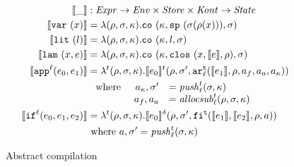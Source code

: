 \documentclass[preprint,onecolumn,9pt]{sigplanconf} %
\begin{document}
\begin{figure}
\begin{align*}
\compile{\_} &: \Expr \to \Env \times \Store \times \Kont \to \State \\
\compile{\svar\mvar} &=
 \lambda(\menv,\msto,\mkont) .
\spchoice
{\co{\mkont,\saddr{\menv(\mvar)},\msto}}
{\co{\mkont,\superposition{\msto(\menv(\mvar))},\msto}}
\\
\compile{\slit\mlit} &= \lambda(\menv,\msto,\mkont) .
\co{\mkont,\mlit,\msto}
\\
\compile{\slam\mvar\mexp} &= \lambda(\menv,\msto,\mkont) .
\co{\mkont,\clos{\mvar,\compile\mexp,\menv},\msto}
\\
\compile{\sapp[^\mlab]{\mexpi0}{\mexpi1}} &= \lambda^\mcntr(\menv,\msto,\mkont) .
\compile{\mexpi0}^\mcntr(\menv,\msto',\kar[_\mlab^\mcntr]{\compile{\mexpi1},\menv,\maddr_f,\maddr_a,\maddr_\mkont})
\\
&\setlength\arraycolsep{5pt}\begin{array}{lrl}\text{ where } & \maddr_\mkont,\msto' &= \push^\mcntr_\mlab(\msto,\mkont) 
\\&
\maddr_f,\maddr_a &= \allocsub^\mcntr_\mlab(\menv,\msto,\mkont)
\end{array}
\\
\compile{\sif[^\mlab]{\mexpi0}{\mexpi1}{\mexpi2}} &= \lambda^\mcntr(\menv,\msto,\mkont) .
\compile{\mexpi0}^\delta(\menv,\msto',\kif[^\mcntr]{\compile{\mexpi1},\compile{\mexpi2},\menv,\maddr})
\\
&\text{ where }\maddr,\msto' = \push_\mlab^\mcntr(\msto,\mkont)
\end{align*}
\caption{Abstract compilation}
\label{fig:compile}
\end{figure}
\end{document}
